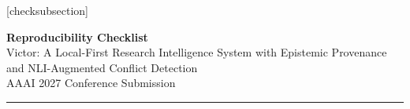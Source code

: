 \documentclass[letterpaper]{article}
\begin{document}
\fi
\setlength{\leftmargini}{20pt}
\makeatletter\def\@listi{\leftmargin\leftmargini \topsep .5em \parsep .5em \itemsep .5em}
\def\@listii{\leftmargin\leftmarginii \labelwidth\leftmarginii \advance\labelwidth-\labelsep \topsep .4em \parsep .4em \itemsep .4em}
\def\@listiii{\leftmargin\leftmarginiii \labelwidth\leftmarginiii \advance\labelwidth-\labelsep \topsep .4em \parsep .4em \itemsep .4em}\makeatother

\setcounter{secnumdepth}{0}
\renewcommand\thesubsection{\arabic{subsection}}
\renewcommand\labelenumi{\thesubsection.\arabic{enumi}}

[checksubsection]

\newcommand{\checksubsection}[1]{%
  \refstepcounter{checksubsection}%
  \paragraph{\arabic{checksubsection}. #1}%
  \setcounter{checkitem}{0}%
}

\newcommand{\checkitem}{%
  \refstepcounter{checkitem}%
  \item[\arabic{checksubsection}.\arabic{checkitem}.]%
}
\newcommand{\question}[2]{\normalcolor\checkitem #1 #2 \color{blue}}
\newcommand{\ifyespoints}[1]{\makebox[0pt][l]{\hspace{-15pt}\normalcolor #1}}

\begin{center}
{\Large\textbf{Reproducibility Checklist}}\\[0.5em]
{\large Victor: A Local-First Research Intelligence System with Epistemic Provenance and NLI-Augmented Conflict Detection}\\[0.3em]
{\small AAAI 2027 Conference Submission}
\end{center}

\vspace{1em}
\hrule
\vspace{1em}

\end{document}
